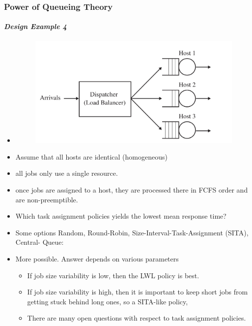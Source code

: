 \documentclass{beamer}
\begin{document}
\begin{frame}
    \frametitle{Power of Queueing Theory}
    \framesubtitle{\textbf{\textit{Design Example 4}}}
	\begin{itemize}
		\item 
			\begin{figure}
        		\begin{center}
		            \includegraphics[scale=0.12]{images/loadbalancer.jpg}
        		\end{center}
		    \end{figure}
		\item Assume that all  hosts are identical (homogeneous) 
		\item all jobs only use a single resource. 
		\item  once jobs are assigned to a host, they are processed there in FCFS order and are 						non-preemptible.
		\item Which task assignment policies yields the lowest mean response time?
		\item Some options	Random, Round-Robin, Size-Interval-Task-Assignment (SITA), Central-						Queue:
		\item More possible. Answer depends on various parameters
			\begin{itemize}
			\item If job size variability is low, then the LWL policy is best. 
			\item If job size variability is high, then it is important to keep short jobs from 							getting stuck behind long ones, so a SITA-like policy, 
			\item There are many open questions with respect to task assignment policies.
			\end{itemize}
	\end{itemize}	    
    
\end{frame}
\end{document}
